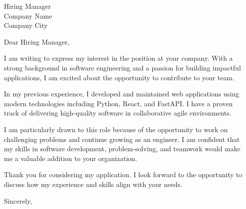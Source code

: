 \documentclass[11pt,a4paper]{letter}
\begin{document}
\begin{letter}{Hiring Manager\\Company Name\\Company City}

\opening{Dear Hiring Manager,}

I am writing to express my interest in the position at your company. With a strong background in software engineering and a passion for building impactful applications, I am excited about the opportunity to contribute to your team.

In my previous experience, I developed and maintained web applications using modern technologies including Python, React, and FastAPI. I have a proven track of delivering high-quality software in collaborative agile environments.

I am particularly drawn to this role because of the opportunity to work on challenging problems and continue growing as an engineer. I am confident that my skills in software development, problem-solving, and teamwork would make me a valuable addition to your organization.

Thank you for considering my application. I look forward to the opportunity to discuss how my experience and skills align with your needs.

\closing{Sincerely,}

\end{letter}
\end{document}
